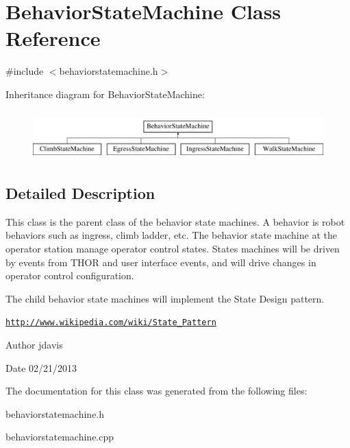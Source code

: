 \hypertarget{classBehaviorStateMachine}{\section{Behavior\-State\-Machine Class Reference}
\label{classBehaviorStateMachine}
}


{\ttfamily \#include $<$behaviorstatemachine.\-h$>$}

Inheritance diagram for Behavior\-State\-Machine\-:\begin{figure}[H]
\begin{center}
\leavevmode
\includegraphics[height=1.891892cm]{classBehaviorStateMachine}
\end{center}
\end{figure}


\subsection{Detailed Description}
This class is the parent class of the behavior state machines. A behavior is robot behaviors such as ingress, climb ladder, etc. The behavior state machine at the operator station manage operator control states. States machines will be driven by events from T\-H\-O\-R and user interface events, and will drive changes in operator control configuration.

The child behavior state machines will implement the State Design pattern.

\href{http://www.wikipedia.com/wiki/State_Pattern}{\tt http\-://www.\-wikipedia.\-com/wiki/\-State\-\_\-\-Pattern}

\begin{DoxyAuthor}{Author}
jdavis 
\end{DoxyAuthor}
\begin{DoxyDate}{Date}
02/21/2013 
\end{DoxyDate}


The documentation for this class was generated from the following files\-:\begin{DoxyCompactItemize}
\item 
behaviorstatemachine.\-h\item 
behaviorstatemachine.\-cpp\end{DoxyCompactItemize}
